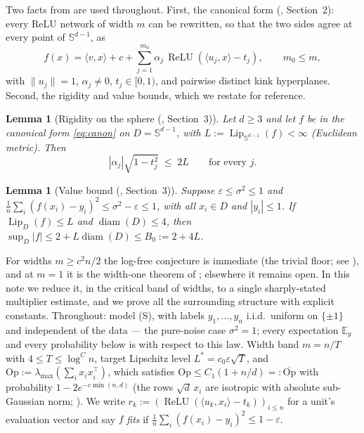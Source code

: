 \documentclass[11pt,reqno]{amsart}
\theoremstyle{plain}
\newtheorem{lemma}[theorem]{Lemma}
\theoremstyle{definition}
\theoremstyle{remark}
\newcommand{\Sd}{\mathbb{S}^{d-1}}
\newcommand{\EE}{\mathbb{E}}
\newcommand{\eps}{\varepsilon}
\newcommand{\Lip}{\operatorname{Lip}}
\newcommand{\relu}{\operatorname{ReLU}}
\newcommand{\inn}[2]{\langle #1,#2\rangle}
\begin{document}
Two facts from \cite{paper} are used throughout. First, the canonical form (\cite{paper}, Section~2): every ReLU network of width $m$ can be rewritten, so that the two sides agree at every point of $\Sd$, as
\begin{equation}\label{eq:canon}
f(x)=\inn{v}{x}+c+\sum_{j=1}^{m_0}\alpha_j\,\relu(\inn{u_j}{x}-t_j),\qquad m_0\le m,
\end{equation}
with $\|u_j\|=1$, $\alpha_j\ne0$, $t_j\in[0,1)$, and pairwise distinct kink hyperplanes. Second, the rigidity and value bounds, which we restate for reference.

\begin{lemma}[Rigidity on the sphere (\cite{paper}, Section~3)]\label{lem:rigidity-sphere}
Let $d\ge3$ and let $f$ be in the canonical form \eqref{eq:canon} on $D=\Sd$, with $L:=\Lip_{\Sd}(f)<\infty$ (Euclidean metric). Then
\[
|\alpha_j|\sqrt{1-t_j^2}\;\le\;2L\qquad\text{for every }j.
\]
\end{lemma}

\begin{lemma}[Value bound (\cite{paper}, Section~3)]\label{lem:B0}
Suppose $\eps\le\sigma^2\le1$ and $\frac1n\sum_i(f(x_i)-y_i)^2\le\sigma^2-\eps\le1$, with all $x_i\in D$ and $|y_i|\le1$. If $\Lip_D(f)\le L$ and $\operatorname{diam}(D)\le4$, then $\sup_D|f|\le2+L\operatorname{diam}(D)\le B_0:=2+4L$.
\end{lemma}

For widths $m\ge c^2n/2$ the log-free conjecture is immediate (the trivial floor; see \cite{paper}), and at $m=1$ it is the width-one theorem of \cite{paper}; elsewhere it remains open. In this note we reduce it, in the critical band of widths, to a single sharply-stated multiplier estimate, and we prove all the surrounding structure with explicit constants. Throughout: model (S), with labels $y_1,\dots,y_n$ i.i.d.\ uniform on $\{\pm1\}$ and independent of the data --- the pure-noise case $\sigma^2=1$; every expectation $\EE_y$ and every probability below is with respect to this law. Width band $m=n/T$ with $4\le T\le\log^Cn$, target Lipschitz level $L^\ast=c_0\eps\sqrt T$, and $\mathrm{Op}:=\lambda_{\max}(\sum_ix_ix_i^\top)$, which satisfies $\mathrm{Op}\le C_1(1+n/d)=:\overline{\mathrm{Op}}$ with probability $1-2e^{-c\min(n,d)}$ (the rows $\sqrt d\,x_i$ are isotropic with absolute sub-Gaussian norm; \cite[Thm.~4.6.1]{Vershynin}). We write $r_k:=(\relu(\inn{u_k}{x_i}-t_k))_{i\le n}$ for a unit's evaluation vector and say $f$ \emph{fits} if $\frac1n\sum_i(f(x_i)-y_i)^2\le1-\eps$.
\end{document}
